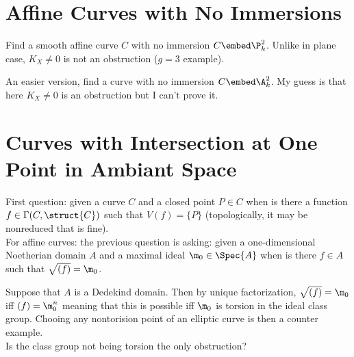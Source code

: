 \documentclass[12pt]{article}
\begin{document}
\section{Affine Curves with No Immersions}

\begin{exercise}
Find a smooth affine curve $C$ with no immersion $C \embed \P^2_k$. Unlike in plane case, $K_X \neq 0$ is not an obstruction ($g = 3$ example). 
\end{exercise}

\begin{exercise}
An easier version, find a curve with no immersion $C \embed \A^2_k$. My guess is that here $K_X \neq 0$ is an obstruction but I can't prove it.
\end{exercise}

\section{Curves with Intersection at One Point in Ambiant Space}

\begin{exercise}
First question: given a curve $C$ and a closed point $P \in C$ when is there a function $f \in \Gamma(C, \struct{C})$ such that $V(f) = \{ P \}$ (topologically, it may be nonreduced that is fine). 
\bigskip\\
For affine curves: the previous question is asking: given a one-dimensional Noetherian domain $A$ and a maximal ideal $\m_0 \in \Spec{A}$ when is there $f \in A$ such that $\sqrt{(f)} = \m_0$. 
\end{exercise}

Suppose that $A$ is a Dedekind domain. Then by unique factorization, $\sqrt{(f)} = \m_0$ iff $(f) = \m_0^n$ meaning that this is possible iff $\m_0$ is torsion in the ideal class group. Chooing any nontorision point of an elliptic curve is then a counter example.
\bigskip\\
Is the class group not being torsion the only obstruction?
\end{document}
